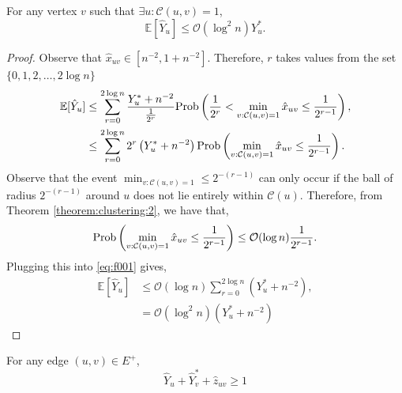 \begin{claim} \label{claim:001}
For any vertex $v$ such that $\exists u : \mathcal{C} (u,v) = 1$,
\begin{equation*}
    \mathbb{E} \left[ \hat{Y}_u \right] \le \mathcal{O} (\log^2 n) Y_u^*.
\end{equation*}
\end{claim}
\begin{proof}
	Observe that $\hat{x}_{uv} \in [n^{-2},1+n^{-2}]$. Therefore, $r$ takes values from the set $\{ 0,1,2,\dots, 2 \log n \}$
	\begin{align}
	    \mathbb{E} [\hat{Y}_u] &\le \sum_{r=0}^{2 \log n} \frac{Y_u^* + n^{-2}}{\frac{1}{2^r}} {\rm Prob} \left(\frac{1}{2^r} < \min_{v : \mathcal{C} (u,v) = 1} \hat{x}_{uv} \le \frac{1}{2^{r-1}} \right),\nonumber\\
        &\le \sum_{r = 0}^{2 \log n} 2^r \left( Y_u^* + n^{-2} \right) {\rm Prob} \left(\min_{v : \mathcal{C} (u,v) = 1} \hat{x}_{uv} \le \frac{1}{2^{r-1}} \right). \label{eq:f001}
	\end{align}
	Observe that the event $\min_{v : \mathcal{C} (u,v) = 1} \le 2^{-(r-1)}$ can only occur if the ball of radius $2^{-(r-1)}$ around $u$ does not lie entirely within $\mathcal{C}(u)$. Therefore, from Theorem \ref{theorem:clustering:2}, we have that,
	\begin{equation*}
        {\rm Prob} \left(\min_{v : \mathcal{C} (u,v) = 1} \hat{x}_{uv} \le \frac{1}{2^{r-1}} \right) \le \mathcal{O} (\log n) \frac{1}{2^{r-1}}.
	\end{equation*}
	Plugging this into \eqref{eq:f001} gives,
	\begin{align*}
        \mathbb{E} [\hat{Y}_u] &\le \mathcal{O} (\log n) \sum_{r = 0}^{2 \log n} \left( Y_u^* + n^{-2} \right),\\
        &= \mathcal{O} (\log^2 n) \left( Y_u^* + n^{-2} \right)
	\end{align*}
	\end{proof}
	\begin{claim} \label{claim:002}
    For any edge $(u,v) \in E^+$,
        \begin{equation} \label{eq:IP3normalized}
	    \hat{Y}_u + \hat{Y}_v^* + \hat{z}_{uv} \ge 1
	\end{equation}
	\end{claim}
